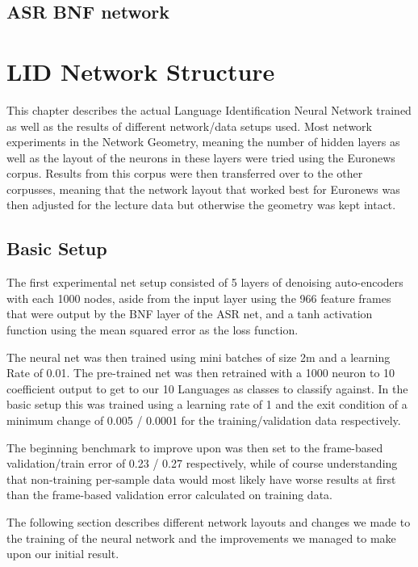 \section{ASR BNF network}
\label{sec:FP:Net}


\chapter{LID Network Structure}
\label{ch:LIDNetwork}

This chapter describes the actual Language Identification Neural Network trained as well as the results of different network/data setups used. Most network experiments in the Network Geometry, meaning the number of hidden layers as well as the layout of the neurons in these layers were tried using the Euronews corpus. Results from this corpus were then transferred over to the other corpusses, meaning that the network layout that worked best for Euronews was then adjusted for the lecture data but otherwise the geometry was kept intact.

\section{Basic Setup}
\label{sec:LIDNetwork:Basic}

The first experimental net setup consisted of 5 layers of denoising auto-encoders with each 1000 nodes, aside from the input layer using the 966 feature frames that were output by the BNF layer of the ASR net, and a tanh activation function using the mean squared error as the loss function. 

The neural net was then trained using mini batches of size 2m and a learning Rate of 0.01. The pre-trained net was then retrained with a 1000 neuron to 10 coefficient output to get to our 10 Languages as classes to classify against. In the basic setup this was trained using a learning rate of 1 and the exit condition of a minimum change of 0.005 / 0.0001 for the training/validation data respectively.

The beginning benchmark to improve upon was then set to the frame-based validation/train error of 0.23 / 0.27 respectively, while of course understanding that non-training per-sample data would most likely have worse results at first than the frame-based validation error calculated on training data.

The following section describes different network layouts and changes we made to the training of the neural network and the improvements we managed to make upon our initial result.

